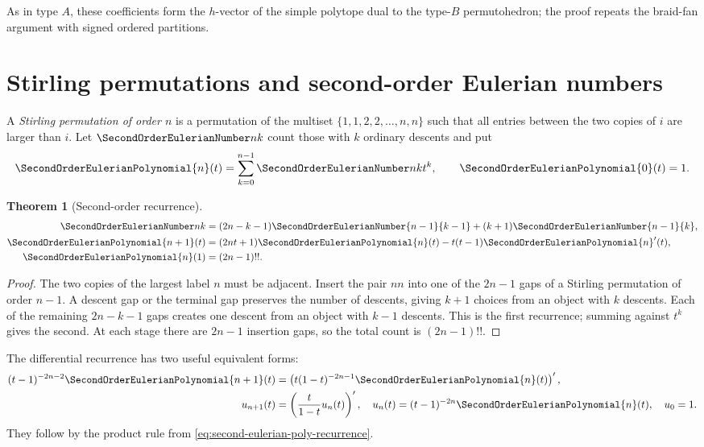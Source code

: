 \documentclass[11pt,a4paper,oneside,openany]{book}
\newtheorem{theorem}{Theorem}[chapter]
\theoremstyle{definition}
\theoremstyle{remark}
\begin{document}
As in type $A$, these coefficients form the $h$-vector of the simple polytope dual
to the type-$B$ permutohedron; the proof repeats the braid-fan argument with signed
ordered partitions.

\section{Stirling permutations and second-order Eulerian numbers}
A \emph{Stirling permutation of order $n$} is a permutation of the multiset
$\{1,1,2,2,\ldots,n,n\}$ such that all entries between the two copies of $i$ are
larger than $i$.  Let $\SecondOrderEulerianNumber nk$ count those with $k$ ordinary descents and put
\[
 \SecondOrderEulerianPolynomial{n}(t)=\sum_{k=0}^{n-1}\SecondOrderEulerianNumber nk t^k,
 \qquad \SecondOrderEulerianPolynomial{0}(t)=1.
\]

\begin{theorem}[Second-order recurrence]\label{thm:second-eulerian-recurrence}
\begin{align}
 \SecondOrderEulerianNumber nk&=(2n-k-1)\SecondOrderEulerianNumber{n-1}{k-1}
 +(k+1)\SecondOrderEulerianNumber{n-1}{k},
 \label{eq:second-eulerian-recurrence}\\
 \SecondOrderEulerianPolynomial{n+1}(t)&=(2nt+1)\SecondOrderEulerianPolynomial{n}(t)-t(t-1)\SecondOrderEulerianPolynomial{n}'(t),
 \label{eq:second-eulerian-poly-recurrence}\\
 \SecondOrderEulerianPolynomial{n}(1)&=(2n-1)!!.
 \label{eq:second-eulerian-row-sum}
\end{align}
\end{theorem}
\begin{proof}
The two copies of the largest label $n$ must be adjacent.  Insert the pair $nn$
into one of the $2n-1$ gaps of a Stirling permutation of order $n-1$.  A descent
gap or the terminal gap preserves the number of descents, giving $k+1$ choices
from an object with $k$ descents.  Each of the remaining $2n-k-1$ gaps creates one
descent from an object with $k-1$ descents.  This is the first recurrence; summing
against $t^k$ gives the second.  At each stage there are $2n-1$ insertion gaps, so
the total count is $(2n-1)!!$.
\end{proof}

The differential recurrence has two useful equivalent forms:
\begin{align}
 (t-1)^{-2n-2}\SecondOrderEulerianPolynomial{n+1}(t)
 &=\left(t(1-t)^{-2n-1}\SecondOrderEulerianPolynomial{n}(t)\right)',
 \label{eq:second-eulerian-differential-form}\\
 u_{n+1}(t)&=\left(\frac{t}{1-t}u_n(t)\right)',
 \quad u_n(t)=(t-1)^{-2n}\SecondOrderEulerianPolynomial{n}(t),\quad u_0=1.
 \label{eq:second-eulerian-u}
\end{align}
They follow by the product rule from
\eqref{eq:second-eulerian-poly-recurrence}.
\end{document}
